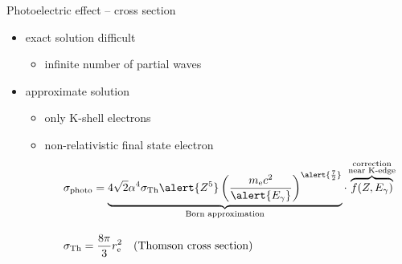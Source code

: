 \documentclass[11pt,xcolor=dvipsnames,professionalfonts]{beamer}
\begin{document}
\begin{frame}{Photoelectric effect -- cross section}
	\begin{itemize}
		\setlength\itemsep{1.5em}
		\item exact solution difficult
		\begin{itemize}
			\item infinite number of partial waves
		\end{itemize}
		\item approximate solution
		\begin{itemize}
			\item only K-shell electrons
			\item non-relativistic final state electron			
			\begin{align*}
				&\sigma_\mathrm{photo} = \underbrace{4\sqrt{2} \alpha^4 \sigma_\mathrm{Th} \alert{Z^5}  \left( \frac{m_\mathrm{e}c^2}{\alert{E_\gamma}} \right)^{\alert{\frac{7}{2}}}}_{\text{Born approximation}} \cdot \, \overbrace{f(Z, E_\gamma)}^{\mathclap{\substack{\text{correction}\\\text{near K-edge}}}} \\[1em]
				&\sigma_\mathrm{Th} = \frac{8 \pi}{3} r_\mathrm{e}^2 \quad \text{(Thomson cross section)}
			\end{align*}
		\end{itemize}
	\end{itemize}
\end{frame}

\end{document}
